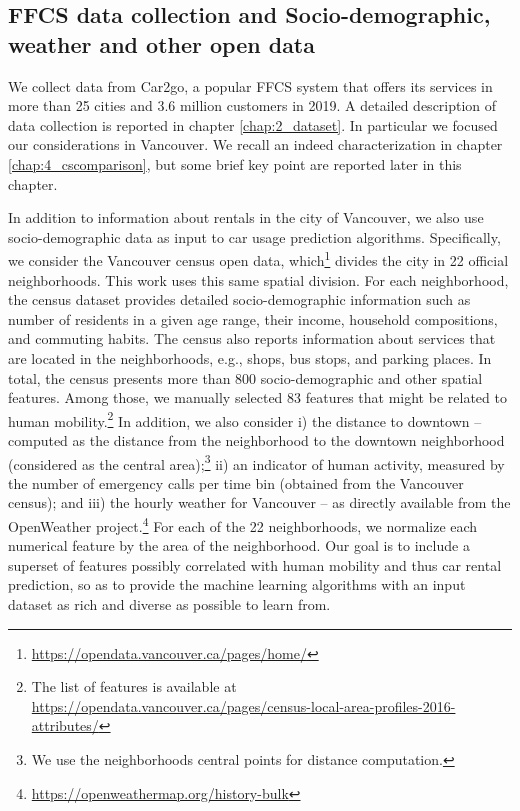 %


\subsection{FFCS data collection and Socio-demographic, weather and other open data}
We collect data from Car2go, a popular FFCS system that offers its services in more than 25 cities and 3.6 million customers in 2019. A detailed description of data collection is reported in chapter \ref{chap:2_dataset}. In particular we focused our considerations in Vancouver. We recall an indeed characterization in chapter \ref{chap:4_cscomparison}, but some brief key point are reported later in this chapter.

In addition to information about rentals in the city of Vancouver, we also use socio-demographic data as input to car usage prediction algorithms. Specifically, we consider the Vancouver census open data, which\footnote{\url{https://opendata.vancouver.ca/pages/home/}} divides the city in 22 official neighborhoods. This work uses this same spatial division. For each neighborhood, the census dataset provides detailed socio-demographic information such as number of residents in a given age range, their income, household compositions, and commuting habits. The census also reports information about services that are located in the neighborhoods, e.g., shops, bus stops, and parking places. In total, the census presents more than 800 socio-demographic and other spatial features. Among those, we manually selected 83 features that might be related to human mobility.\footnote{The list of features is available at \url{https://opendata.vancouver.ca/pages/census-local-area-profiles-2016-attributes/}} 
In addition, we also consider i) the distance to downtown -- computed as the distance from the neighborhood to the downtown neighborhood (considered as the central area);\footnote{We use the neighborhoods central points for distance computation.} ii) an indicator of human activity, measured by the number of emergency calls per time bin (obtained from the Vancouver census);   and iii) the hourly weather for Vancouver -- as directly available from the OpenWeather project.\footnote{\url{https://openweathermap.org/history-bulk}} 
For each of the 22 neighborhoods, we normalize each numerical feature by the area of the neighborhood. 
Our goal is to include a superset of features possibly correlated with human mobility and thus car rental prediction, so as to provide the machine learning algorithms with an input dataset as rich and diverse as possible to learn from.


